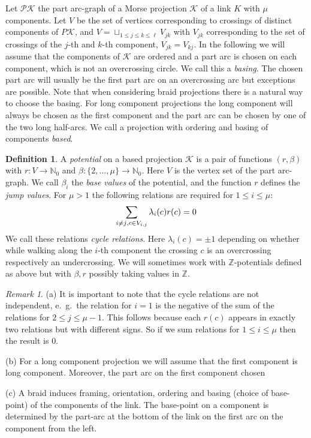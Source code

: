 \documentclass[11pt]{article}
\theoremstyle{definition}
\newtheorem{defn}{Definition}[section]
\theoremstyle{remark}
\newtheorem*{rem}{Remark}
\theoremstyle{remark}
\begin{document}
\vskip 0.1in

Let $\mathcal{P}\mathcal{K}$ the part arc-graph of a Morse projection $\mathcal{K}$ of a link $K$ with $\mu $ components.  Let $V$ be the set of vertices corresponding to crossings of distinct components of $P\mathcal{K}$, and $V=\sqcup _{1\leq j\leq k\leq \ell} V_{jk}$ with $V_{jk}$ corresponding to the set of crossings of the $j$-th and $k$-th component, $V_{jk}=V_{kj}$.
In the following we will assume that the components of $\mathcal{K}$ are ordered and a part arc is chosen on each component, which is not an overcrossing circle. We call this a \textit{basing}. The chosen part arc will usually be the first part arc on an overcrossing arc but exceptions are possible. Note that when considering braid projections there is a natural way to choose the basing. For long component projections the long component will always be chosen as the first component and the part arc 
can be chosen by one of the two long half-arcs. We call a projection with ordering and basing of components \textit{based}. 

\begin{defn} \label{defn=potential}  A \textit{potential} on a based projection $\mathcal{K}$ is a pair of functions $(r,\beta )$ with $r: V\rightarrow \mathbb{N}_0$ and $\beta :\{2,\ldots ,\mu \}\rightarrow \mathbb{N}_0$. 
Here $V$ is the vertex set of the part arc-graph. We call $\beta_i$ the \textit{base values} of the potential, and the function $r$ defines the 
\textit{jump values}.
For $\mu >1$ the following relations are required for $1\leq i\leq \mu$:
$$\sum_{ i\neq j\\ ,c\in V_{i,j}}\lambda_i(c)r(c)=0$$
We call these relations \textit{cycle relations}. Here $\lambda_i(c)=\pm 1$ depending on whether while walking along the $i$-th component the crossing $c$ is an overcrossing respectively an undercrossing. 
We will sometimes work with $\mathbb{Z}$-potentials defined as above but with $\beta ,r$ possibly taking values in $\mathbb{Z}$.  
\end{defn}

\begin{rem}
\noindent (a) It is important to note that the cycle relations are not independent, e.\ g.\ the relation for $i=1$ is the negative of the sum of the relations for $2\leq j\leq \mu -1$. This follows because each $r(c)$ appears in exactly two relations but with different signs. So if we sum relations for $1\leq i\leq \mu$ then the result is $0$. 

\noindent (b) For a long component projection we will assume that the first component is long component. Moreover, the part arc on the first component chosen 

\noindent (c) A braid induces framing, orientation, ordering  and basing (choice of base-point) of the components of the link. The base-point on a component is determined by the part-arc at the bottom of the link on the first arc on the component from the left.
\end{rem}
\end{document}

